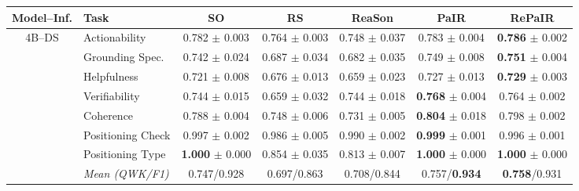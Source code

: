 \begin{table}[!tp]
\centering
\captionsetup{font=compacttable,skip=3pt}

{\fontsize{9pt}{9.8pt}\selectfont
\setlength{\tabcolsep}{0.8pt}
\renewcommand{\arraystretch}{0.85}
\begin{tabular*}{\textwidth}{@{\extracolsep{\fill}}clccccc@{}}
\toprule
Model--Inf. & Task & SO & RS & ReaSon & PaIR & RePaIR \\
\midrule

\multirow{8}{*}{4B--DS}
& Actionability & 0.782 $\pm$ 0.003 & 0.764 $\pm$ 0.003 & 0.748 $\pm$ 0.037 & 0.783 $\pm$ 0.004 & \textbf{0.786} $\pm$ 0.002 \\
& Grounding Spec. & 0.742 $\pm$ 0.024 & 0.687 $\pm$ 0.034 & 0.682 $\pm$ 0.035 & 0.749 $\pm$ 0.008 & \textbf{0.751} $\pm$ 0.004 \\
& Helpfulness & 0.721 $\pm$ 0.008 & 0.676 $\pm$ 0.013 & 0.659 $\pm$ 0.023 & 0.727 $\pm$ 0.013 & \textbf{0.729} $\pm$ 0.003 \\
& Verifiability & 0.744 $\pm$ 0.015 & 0.659 $\pm$ 0.032 & 0.744 $\pm$ 0.018 & \textbf{0.768} $\pm$ 0.004 & 0.764 $\pm$ 0.002 \\
\cmidrule(lr){2-7}
& Coherence & 0.788 $\pm$ 0.004 & 0.748 $\pm$ 0.006 & 0.731 $\pm$ 0.005 & \textbf{0.804} $\pm$ 0.018 & 0.798 $\pm$ 0.002 \\
& Positioning Check & 0.997 $\pm$ 0.002 & 0.986 $\pm$ 0.005 & 0.990 $\pm$ 0.002 & \textbf{0.999} $\pm$ 0.001 & 0.996 $\pm$ 0.001 \\
& Positioning Type & \textbf{1.000} $\pm$ 0.000 & 0.854 $\pm$ 0.035 & 0.813 $\pm$ 0.007 & \textbf{1.000} $\pm$ 0.000 & \textbf{1.000} $\pm$ 0.000 \\
& \textit{Mean (QWK/F1)} & 0.747/0.928 & 0.697/0.863 & 0.708/0.844 & 0.757/\textbf{0.934} & \textbf{0.758}/0.931 \\
\midrule


\end{tabular*}}
\end{table}
